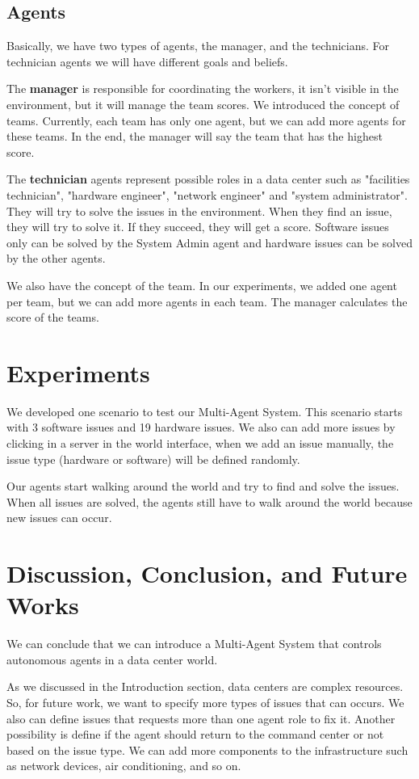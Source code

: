 \documentclass[letterpaper]{article}
\begin{document}
\subsection{Agents}

Basically, we have two types of agents, the manager, and the technicians. For technician agents we will have different goals and beliefs.

The \textbf{manager} is responsible for coordinating the workers, it isn't visible in the environment, but it will manage the team scores. We introduced the concept of teams. Currently, each team has only one agent, but we can add more agents for these teams. In the end, the manager will say the team that has the highest score.

The \textbf{technician} agents represent possible roles in a data center such as "facilities technician", "hardware engineer", "network engineer" and "system administrator". They will try to solve the issues in the environment. When they find an issue, they will try to solve it. If they succeed, they will get a score. Software issues only can be solved by the System Admin agent and hardware issues can be solved by the other agents.

We also have the concept of the team. In our experiments, we added one agent per team, but we can add more agents in each team. The manager calculates the score of the teams.

\section{Experiments}\label{sec:experiments}

We developed one scenario to test our Multi-Agent System. This scenario starts with 3 software issues and 19 hardware issues. We also can add more issues by clicking in a server in the world interface, when we add an issue manually, the issue type (hardware or software) will be defined randomly.

Our agents start walking around the world and try to find and solve the issues. When all issues are solved, the agents still have to walk around the world because new issues can occur.

\section{Discussion, Conclusion, and Future Works}\label{sec:conclusions}

We can conclude that we can introduce a Multi-Agent System that controls autonomous agents in a data center world.

As we discussed in the Introduction section, data centers are complex resources. So, for future work, we want to specify more types of issues that can occurs. We also can define issues that requests more than one agent role to fix it. Another possibility is define if the agent should return to the command center or not based on the issue type. We can add more components to the infrastructure such as network devices, air conditioning, and so on.



\end{document}
